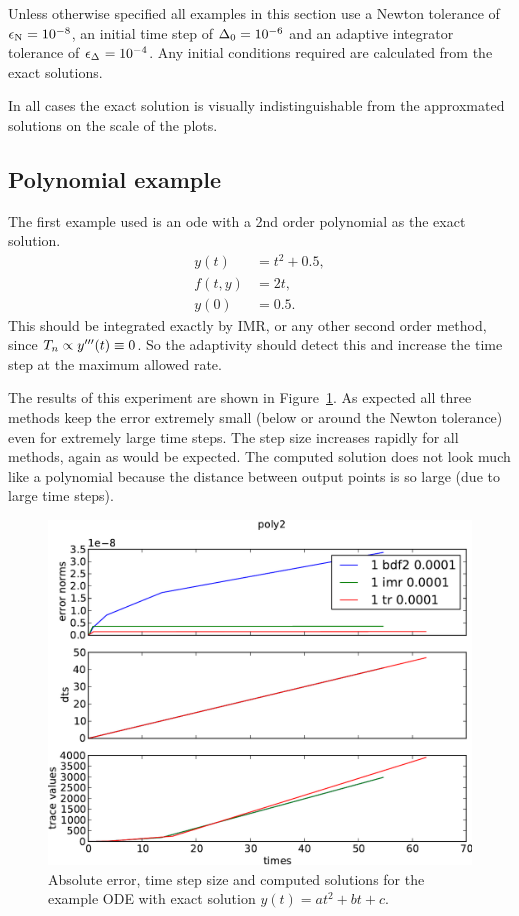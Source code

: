Unless otherwise specified all examples in this section use a Newton tolerance of $\epsilon_{\text{N}} = 10^{-8}$, an initial time step of $\Delta_{0} = 10^{-6}$ and an adaptive integrator tolerance of $\epsilon_{\Delta_{}} = 10^{-4}$.
Any initial conditions required are calculated from the exact solutions.

In all cases the exact solution is visually indistinguishable from the approxmated solutions on the scale of the plots.


\subsection{Polynomial example}
\label{sec:imr-polynomial-example}

The first example used is an ode with a 2nd order polynomial as the exact solution.
\begin{equation}
  \label{eqn:imr-test-poly2}
  \begin{aligned}
    y(t) &= t^2 + 0.5, \\
    f(t,y) &= 2t, \\
    y(0) & = 0.5.
  \end{aligned}
\end{equation}
This should be integrated exactly by IMR, or any other second order method, since $T_n \propto y'''(t) \equiv 0$.
So the adaptivity should detect this and increase the time step at the maximum allowed rate.

The results of this experiment are shown in Figure~\ref{fig:imr-poly2-example}. 
As expected all three methods keep the error extremely small (below or around the Newton tolerance) even for extremely large time steps.
The step size increases rapidly for all methods, again as would be expected.
The computed solution does not look much like a polynomial because the distance between output points is so large (due to large time steps).

\begin{figure}[h!]
  \centering
  \includegraphics[width=1\textwidth]{aimr/poly2-errornormsvs-dtsvs-tracevaluesvstimes}
  \caption{Absolute error, time step size and computed solutions for the example ODE with exact solution $y(t) = at^2 + bt + c$.}
  \label{fig:imr-poly2-example}
\end{figure}



